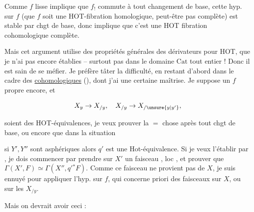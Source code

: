 Comme $f$ lisse implique que $f_!$ commute à tout changement de base,  cette hyp.  sur $f$ (que $f$ soit une HOT-fibration homologique, peut-être pas complète)  est stable par chgt de base, donc implique que c'est une HOT fibration cohomologique complète.

Mais cet argument utilise  des propriétés générales des dérivateurs pour HOT, que je n'ai pas encore établies -- surtout pas dans le domaine $\mathrm{Cat}$ tout entier ! Donc il est sain de se méfier. Je préfère tâter la difficulté, en restant d'abord dans le cadre des  \uline{cohomologiques} (), dont j'ai une certaine maîtrise. Je suppose un $f$ propre encore, et 

\[
X_y\to X_{/y},\quad X_{/y}\to X_{/\unsure{y|y'}},
\]



\margin{$\unsure{\ast|\times}$}

soient des HOT-équivalences, je veux prouver la $=$ chose après tout chgt de base, ou encore que dans la situation


si $Y',Y''$ sont asphériques alors $q'$ est une Hot-équivalence. Si je veux l'établir par  , je dois commencer par prendre sur $X'$ un faisceau \uline{}, loc  , et prouver que $\Gamma(X',F)\simeq\Gamma(X'',q'{}^*F)$. Comme ce faisceau ne provient pas de $X$, je suis ennuyé pour appliquer l'hyp. sur $f$, qui concerne  priori des faisceaux  sur $X$, ou sur les $X_{/y}$.

Mais on devrait avoir ceci :


